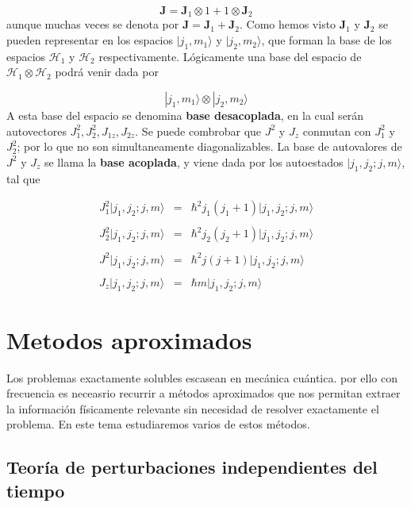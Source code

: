 \documentclass[12pt,a4paper]{book}
\numberwithin{equation}{chapter}
\numberwithin{figure}{chapter}
\newcommand{\Hcal}{\mathcal{H}}
\newcommand{\Jn}{\mathbf{J}}
\begin{document}
\begin{equation}
\Jn = \Jn_1 \otimes 1 + 1 \otimes \Jn_2
\end{equation}
aunque muchas veces se denota por $\Jn=\Jn_1+\Jn_2$. Como hemos visto $\Jn_1$ y $\Jn_2$ se pueden representar en los espacios $|j_1,m_1\rangle$ y $|j_2,m_2\rangle$, que forman la base de los espacios $\Hcal_1$ y $\Hcal_2$ respectivamente. Lógicamente una base del espacio de $\Hcal_1 \otimes \Hcal_2$ podrá venir dada por

\begin{equation}
|j_1 ,m_1\rangle \otimes |j_2,m_2 \rangle
\end{equation}
A esta base del espacio se denomina \textbf{base desacoplada}, en la cual serán autovectores $J_1^2,J_2^2,J_{1z},J_{2z}$. Se puede combrobar que $J^2$ y $J_z$ conmutan con $J_1^2$ y $J_2^2$; por lo que no son simultaneamente diagonalizables. La base de autovalores de $J^2$ y $J_z$ se llama la \textbf{base acoplada}, y viene dada por los autoestados $|j_1,j_2;j,m\rangle$, tal que

\begin{equation}
\begin{array}{lll}
J_1^2 |j_1,j_2;j,m\rangle & = & \hbar^2 j_1(j_1+1)|j_1,j_2;j,m\rangle \\ \\
J_2^2 |j_1,j_2;j,m\rangle & = & \hbar^2 j_2(j_2+1)|j_1,j_2;j,m\rangle \\ \\
J^2 |j_1,j_2;j,m\rangle& = & \hbar^2 j(j+1) |j_1,j_2;j,m\rangle \\ \\
J_z |j_1,j_2;j,m\rangle & = & \hbar m |j_1,j_2;j,m\rangle 
\end{array}
\end{equation} 

\chapter{Metodos aproximados}

Los problemas exactamente solubles escasean en mecánica cuántica. por ello con frecuencia es neceasrio recurrir a métodos aproximados que nos permitan extraer la información físicamente relevante sin necesidad de resolver exactamente el problema. En este tema estudiaremos varios de estos métodos.  \\

\section{Teoría de perturbaciones independientes del tiempo}
\end{document}

